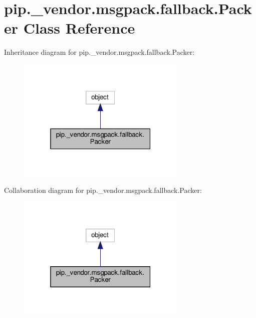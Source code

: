 \hypertarget{classpip_1_1__vendor_1_1msgpack_1_1fallback_1_1Packer}{}\section{pip.\+\_\+vendor.\+msgpack.\+fallback.\+Packer Class Reference}
\label{classpip_1_1__vendor_1_1msgpack_1_1fallback_1_1Packer}


Inheritance diagram for pip.\+\_\+vendor.\+msgpack.\+fallback.\+Packer\+:
\nopagebreak
\begin{figure}[H]
\begin{center}
\leavevmode
\includegraphics[width=229pt]{classpip_1_1__vendor_1_1msgpack_1_1fallback_1_1Packer__inherit__graph}
\end{center}
\end{figure}


Collaboration diagram for pip.\+\_\+vendor.\+msgpack.\+fallback.\+Packer\+:
\nopagebreak
\begin{figure}[H]
\begin{center}
\leavevmode
\includegraphics[width=229pt]{classpip_1_1__vendor_1_1msgpack_1_1fallback_1_1Packer__coll__graph}
\end{center}
\end{figure}
